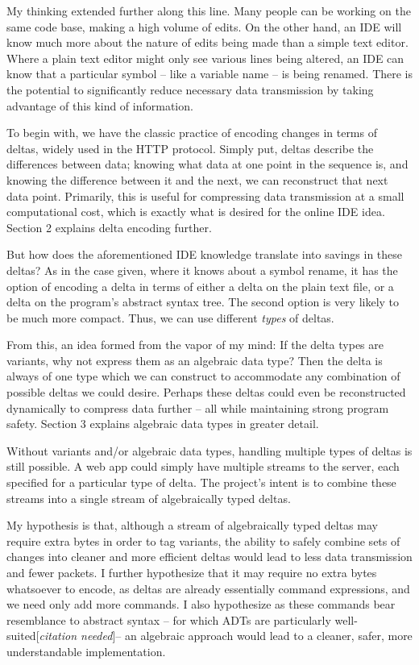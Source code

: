 \documentclass[12pt,a4paper]{article}
\newcommand{\citationNeeded}{[\textit{citation needed}]}
\begin{document}
	My thinking extended further along this line. Many people can be working on the same code base, making a high volume of edits. On the other hand, an IDE will know much more about the nature of edits being made than a simple text editor. Where a plain text editor might only see various lines being altered, an IDE can know that a particular symbol -- like a variable name -- is being renamed. There is the potential to significantly reduce necessary data transmission by taking advantage of this kind of information.
	
	To begin with, we have the classic practice of encoding changes in terms of deltas, widely used in the HTTP protocol\cite{BenefitsDeltaEncodingHTTP,DeltaEncodingHTTP}. Simply put, deltas describe the differences between data; knowing what data at one point in the sequence is, and knowing the difference between it and the next, we can reconstruct that next data point. Primarily, this is useful for compressing data transmission at a small computational cost, which is exactly what is desired for the online IDE idea. Section 2 explains delta encoding further.
	
	But how does the aforementioned IDE knowledge translate into savings in these deltas? As in the case given, where it knows about a symbol rename, it has the option of encoding a delta in terms of either a delta on the plain text file, or a delta on the program's abstract syntax tree. The second option is very likely to be much more compact. Thus, we can use different \textit{types} of deltas.
	
	From this, an idea formed from the vapor of my mind: If the delta types are variants, why not express them as an algebraic data type? Then the delta is always of one type which we can construct to accommodate any combination of possible deltas we could desire. Perhaps these deltas could even be reconstructed dynamically to compress data further --  all while maintaining strong program safety. Section 3 explains algebraic data types in greater detail.
	
	Without variants and/or algebraic data types, handling multiple types of deltas is still possible. A web app could simply have multiple streams to the server, each specified for a particular type of delta. The project's intent is to combine these streams into a single stream of algebraically typed deltas.
	
	My hypothesis is that, although a stream of algebraically typed deltas may require extra bytes in order to tag variants, the ability to safely combine sets of changes into cleaner and more efficient deltas would lead to less data transmission and fewer packets. I further hypothesize that it may require no extra bytes whatsoever to encode, as deltas are already essentially command expressions, and we need only add more commands. I also hypothesize as these commands bear resemblance to abstract syntax -- for which ADTs are particularly well-suited\citationNeeded -- an algebraic approach would lead to a cleaner, safer, more understandable implementation.
	
\end{document}
